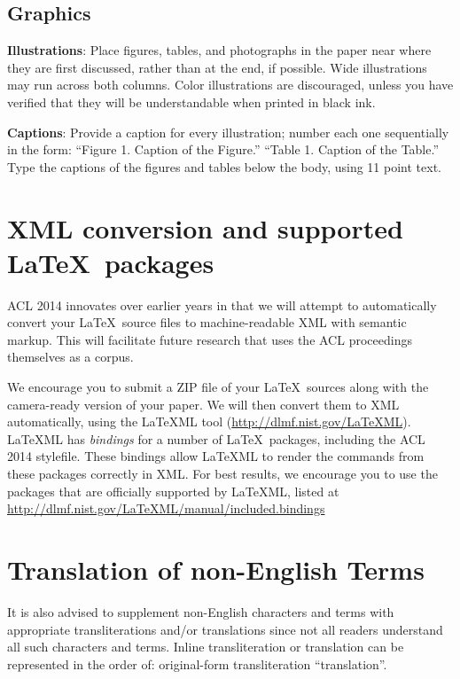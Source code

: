 \documentclass[11pt]{article}
\begin{document}
\subsection{Graphics}

{\bf Illustrations}: Place figures, tables, and photographs in the
paper near where they are first discussed, rather than at the end, if
possible.  Wide illustrations may run across both columns.  Color
illustrations are discouraged, unless you have verified that  
they will be understandable when printed in black ink.

{\bf Captions}: Provide a caption for every illustration; number each one
sequentially in the form:  ``Figure 1. Caption of the Figure.'' ``Table 1.
Caption of the Table.''  Type the captions of the figures and 
tables below the body, using 11 point text.


\section{XML conversion and supported \LaTeX\ packages}

ACL 2014 innovates over earlier years in that we will attempt to
automatically convert your \LaTeX\ source files to machine-readable
XML with semantic markup. This will facilitate future research that
uses the ACL proceedings themselves as a corpus.

We encourage you to submit a ZIP file of your \LaTeX\ sources along
with the camera-ready version of your paper. We will then convert them
to XML automatically, using the LaTeXML tool
(\url{http://dlmf.nist.gov/LaTeXML}). LaTeXML has \emph{bindings} for
a number of \LaTeX\ packages, including the ACL 2014 stylefile. These
bindings allow LaTeXML to render the commands from these packages
correctly in XML. For best results, we encourage you to use the
packages that are officially supported by LaTeXML, listed at
\url{http://dlmf.nist.gov/LaTeXML/manual/included.bindings}





\section{Translation of non-English Terms}

It is also advised to supplement non-English characters and terms
with appropriate transliterations and/or translations
since not all readers understand all such characters and terms.
Inline transliteration or translation can be represented in
the order of: original-form transliteration ``translation''.
\end{document}
